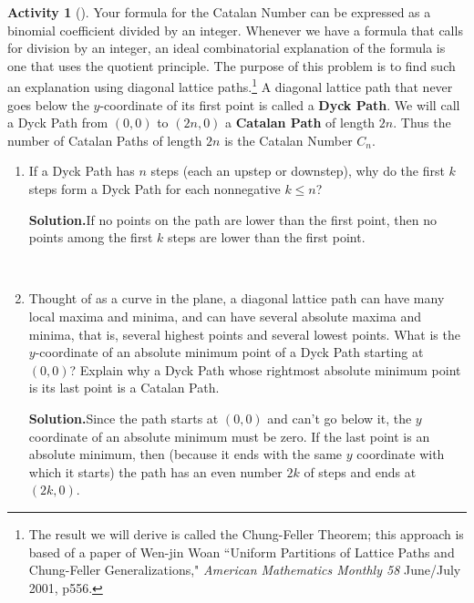 \documentclass[10pt,]{book}
\newcommand{\terminology}[1]{\textbf{#1}}
\theoremstyle{plain}
\theoremstyle{definition}
\newtheorem{activity}[project]{Activity}
\numberwithin{equation}{chapter}
\begin{document}
\begin{activity}[]\label{activity-6}
Your formula for the Catalan Number can be expressed as a binomial coefficient divided by an integer. Whenever we have a formula that calls for division by an integer, an ideal combinatorial explanation of the formula is one that uses the quotient principle. The purpose of this problem is to find such an explanation using diagonal lattice paths.\footnote{The result we will derive is called the Chung-Feller Theorem; this approach is based of a paper of Wen-jin Woan ``Uniform Partitions of Lattice Paths and Chung-Feller Generalizations," \textsl{American Mathematics Monthly 58} June/July 2001, p556.\label{fn-1}} A diagonal lattice path that never goes below the \(y\)-coordinate of its first point is called a \terminology{Dyck Path}. We will call a Dyck Path from \((0,0)\) to \((2n,0)\) a \terminology{Catalan Path} of length \(2n\). Thus the number of Catalan Paths of length \(2n\) is the Catalan Number \(C_n\).%
~\par
\begin{enumerate}[label=(\alph*)]
 \item If a Dyck Path has \(n\) steps (each an upstep or downstep), why do the first \(k\) steps form a Dyck Path for each nonnegative \(k\le n\)?%
\par\medskip\noindent%
\textbf{Solution.}\quad If no points on the path are lower than the first point, then no points among the first \(k\) steps are lower than the first point.%

~\par
\item Thought of as a curve in the plane, a diagonal lattice path can have many local maxima and minima, and can have several absolute maxima and minima, that is, several highest points and several lowest points. What is the \(y\)-coordinate of an absolute minimum point of a Dyck Path starting at \((0,0)\)?  Explain why a Dyck Path whose rightmost absolute minimum point is its last point is a Catalan Path.%
\par\medskip\noindent%
\textbf{Solution.}\quad Since the path starts at \((0,0)\) and can't go below it, the \(y\) coordinate of an absolute minimum must be zero. If the last point is an absolute minimum, then (because it ends with the same \(y\) coordinate with which it starts) the path has an even number \(2k\) of steps and ends at \((2k,0)\).%


\end{enumerate}
\end{activity}
\end{document}
